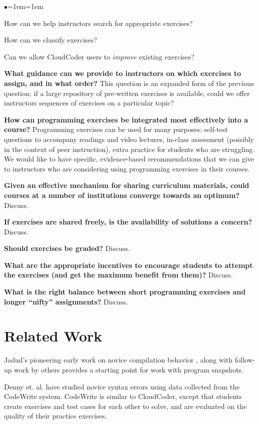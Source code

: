 \documentclass{sig-alternate}
\newenvironment{denseItemize}{%
\begin{list}{$\bullet$}{\setlength{\itemsep}{0in}\setlength{\parsep}{0in}\leftmargin=1em\labelwidth=1em}}{\end{list}}
\begin{document}
\begin{denseItemize}
\item How can we help instructors search for appropriate exercises?
\item How can we classify exercises?
\item Can we allow CloudCoder users to {\em improve} existing exercises?
\end{denseItemize}

{\bf What guidance can we provide to instructors on which exercises to assign,
and in what order?}  This question is an expanded form of the previous question:
if a large repository of pre-written exercises is available,
could we offer instructors sequences of exercises on a particular topic?

{\bf How can programming exercises be integrated most effectively into a course?}
Programming exercises can be used for many purposes: self-test questions
to accompany readings and video lectures, in-class assessment (possibly
in the context of peer instruction), extra practice for students who
are struggling.  We would like to have specific, evidence-based recommendations
that we can give to instructors who are considering using programming
exercises in their courses.

{\bf Given an effective mechanism for sharing curriculum materials, could
courses at a number of institutions converge towards an optimum?}
Discuss.

{\bf If exercises are shared freely, is the availability of solutions a concern?}
Discuss.

{\bf Should exercises be graded?}
Discuss.

{\bf What are the appropriate incentives to encourage students to attempt
the exercises (and get the maximum benefit from them)?}
Discuss.

{\bf What is the right balance between short programming exercises and
  longer ``nifty'' assignments?}
Discuss.

\section{Related Work}

Jadud's pioneering early work on novice compilation behavior
\cite{Jadud:2006:MTE:1151588.1151600}, along with follow-up work by
others \cite{Norris:2008:CCQ:1384271.1384284} provides a starting point for
work with program snapshots.

Denny et. al. have studied novice syntax errors
\cite{Denny:2012:SEE:2325296.2325318} using data collected from the CodeWrite system.
CodeWrite is similar to CloudCoder, except that students create
exercises and test cases for each other to solve, and are evaluated on
the quality of their practice exercises.
\end{document}
